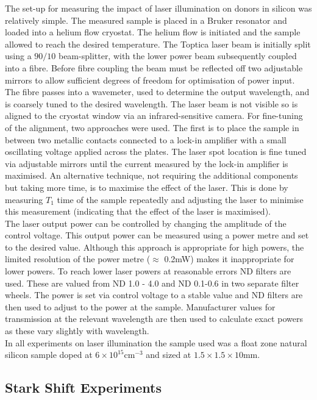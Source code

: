 The set-up for measuring the impact of laser illumination on donors in silicon was relatively simple.
The measured sample is placed in a Bruker resonator and loaded into a helium flow cryostat.
The helium flow is initiated and the sample allowed to reach the desired temperature.
The Toptica laser beam is initially split using a $90/10$ beam-splitter, with the lower power beam subsequently coupled into a fibre.
Before fibre coupling the beam must be reflected off two adjustable mirrors to allow sufficient degrees of freedom for optimisation of power input.
The fibre passes into a wavemeter, used to determine the output wavelength, and is coarsely tuned to the desired wavelength.
The laser beam is not visible so is aligned to the cryostat window via an infrared-sensitive camera.
For fine-tuning of the alignment, two approaches were used.
The first is to place the sample in between two metallic contacts connected to a lock-in amplifier with a small oscillating voltage applied across the plates.
The laser spot location is fine tuned via adjustable mirrors until the current measured by the lock-in amplifier is maximised.
An alternative technique, not requiring the additional components but taking more time, is to maximise the effect of the laser.
This is done by measuring $T_1$ time of the sample repeatedly and adjusting the laser to minimise this measurement (indicating that the effect of the laser is maximised). 
\\
The laser output power can be controlled by changing the amplitude of the control voltage.
This output power can be measured using a power metre and set to the desired value.
Although this approach is appropriate for high powers, the limited resolution of the power metre ($\approx$ 0.2mW) makes it inappropriate for lower powers.
To reach lower laser powers at reasonable errors ND filters are used.
These are valued from ND 1.0 - 4.0 and ND 0.1-0.6 in two separate filter wheels.
The power is set via control voltage to a stable value and ND filters are then used to adjust to the power at the sample.
Manufacturer values for transmission at the relevant wavelength are then used to calculate exact powers as these vary slightly with wavelength.
\\
In all experiments on laser illumination the sample used was a float zone natural silicon sample doped at $6\times10^{15}\text{cm}^{-3}$ and sized at $1.5\times1.5\times10$mm.

\subsection{Stark Shift Experiments}

